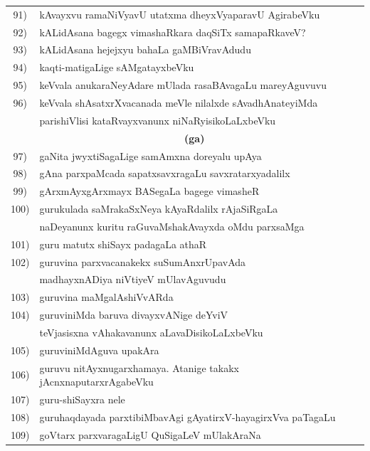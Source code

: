 \begin{longtable}{@{}cp{7.4cm}r}
91) & kAvayxvu ramaNiVyavU utatxma dheyxVyaparavU AgirabeVku & \pageref{page244a}\\
92) & kALidAsana bagegx vimashaRkara daqSiTx samapaRkaveV? & \pageref{page233} \\
93) & kALidAsana hejejxyu bahaLa gaMBiVravAdudu & \pageref{page243}\\
94) & kaqti-matigaLige sAMgatayxbeVku & \pageref{page123b}\\
95) & keVvala anukaraNeyAdare mUlada rasaBAvagaLu mareyAguvuvu & \pageref{page141}\\
96) & keVvala shAsatxrXvacanada meVle nilalxde sAvadhAnateyiMda & \\
    & parishiVlisi kataRvayxvanunx niNaRyisikoLaLxbeVku & \pageref{page253a}\\[0.3cm]
    & \multicolumn{1}{c}{\textbf{(ga)}} & \\[0.3cm]
97) & gaNita jwyxtiSagaLige samAmxna doreyalu upAya & \pageref{page51}\\
98) & gAna parxpaMcada sapatxsavxragaLu savxratarxyadalilx & \pageref{page121}\\
99) & gArxmAyxgArxmayx BASegaLa bagege vimasheR & \pageref{page6a}\\
100) & gurukulada saMrakaSxNeya kAyaRdalilx rAjaSiRgaLa & \\
     & naDeyanunx kuritu raGuvaMshakAvayxda oMdu parxsaMga & \pageref{page232}\\
101) & guru matutx shiSayx padagaLa athaR & \pageref{page190}\\ 
102) & guruvina parxvacanakekx suSumAnxrUpavAda & \\
     & madhayxnADiya niVtiyeV mUlavAguvudu & \pageref{page101}\\
103) & guruvina maMgalAshiVvARda & \pageref{page75}\\
104) & guruviniMda baruva divayxvANige deYviV & \\
     & teVjasisxna vAhakavanunx aLavaDisikoLaLxbeVku & \pageref{page79}\\
105) & guruviniMdAguva upakAra & \pageref{page91a}\\
106) & guruvu nitAyxnugarxhamaya. Atanige takakx jAcnxnaputarxrAgabeVku & \pageref{page74}\\
107) & guru-shiSayxra nele & \pageref{page66a}\\
108) & guruhaqdayada parxtibiMbavAgi gAyatirxV-hayagirxVva paTagaLu & \pageref{page76}\\
109) & goVtarx parxvaragaLigU QuSigaLeV mUlakAraNa & \pageref{page139}\\[0.3cm]

\end{longtable}
